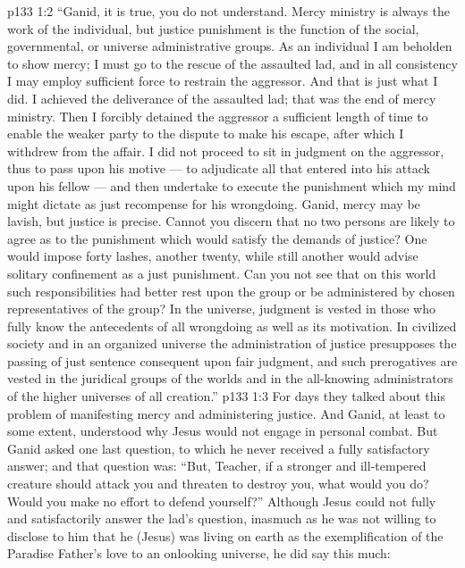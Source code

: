 \vs p133 1:2 \textcolor{ubdarkred}{“Ganid, it is true, you do not understand. Mercy ministry is always the work of the individual, but justice punishment is the function of the social, governmental, or universe administrative groups. As an individual I am beholden to show mercy; I must go to the rescue of the assaulted lad, and in all consistency I may employ sufficient force to restrain the aggressor. And that is just what I did. I achieved the deliverance of the assaulted lad; that was the end of mercy ministry. Then I forcibly detained the aggressor a sufficient length of time to enable the weaker party to the dispute to make his escape, after which I withdrew from the affair. I did not proceed to sit in judgment on the aggressor, thus to pass upon his motive --- to adjudicate all that entered into his attack upon his fellow --- and then undertake to execute the punishment which my mind might dictate as just recompense for his wrongdoing. Ganid, mercy may be lavish, but justice is precise. Cannot you discern that no two persons are likely to agree as to the punishment which would satisfy the demands of justice? One would impose forty lashes, another twenty, while still another would advise solitary confinement as a just punishment. Can you not see that on this world such responsibilities had better rest upon the group or be administered by chosen representatives of the group? In the universe, judgment is vested in those who fully know the antecedents of all wrongdoing as well as its motivation. In civilized society and in an organized universe the administration of justice presupposes the passing of just sentence consequent upon fair judgment, and such prerogatives are vested in the juridical groups of the worlds and in the all\hyp{}knowing administrators of the higher universes of all creation.”}
\vs p133 1:3 For days they talked about this problem of manifesting mercy and administering justice. And Ganid, at least to some extent, understood why Jesus would not engage in personal combat. But Ganid asked one last question, to which he never received a fully satisfactory answer; and that question was: “But, Teacher, if a stronger and ill\hyp{}tempered creature should attack you and threaten to destroy you, what would you do? Would you make no effort to defend yourself?” Although Jesus could not fully and satisfactorily answer the lad’s question, inasmuch as he was not willing to disclose to him that he (Jesus) was living on earth as the exemplification of the Paradise Father’s love to an onlooking universe, he did say this much:
